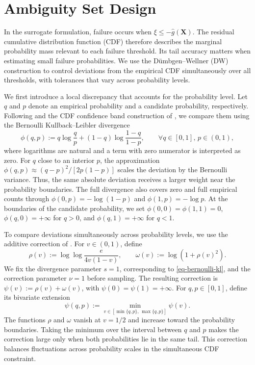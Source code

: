 \documentclass[review,11pt,3p,authoryear,nopreprintline]{elsarticle}
\begin{document}
\section{Ambiguity Set Design}
\label{sec-ambiguity-set}

In the surrogate formulation, failure occurs when $\xi\le-\hat g(\bm X)$. The residual cumulative distribution function (CDF) therefore describes the marginal probability mass relevant to each failure threshold. Its tail accuracy matters when estimating small failure probabilities. We use the D\"umbgen--Wellner (DW) construction \citep{L.J23} to control deviations from the empirical CDF simultaneously over all thresholds, with tolerances that vary across probability levels.

We first introduce a local discrepancy that accounts for the probability level. Let $q$ and $p$ denote an empirical probability and a candidate probability, respectively. Following \citet{B.J79} and the CDF confidence band construction of \citet{O95}, we compare them using the Bernoulli Kullback--Leibler divergence
\begin{equation}
  \phi(q,p):=q\log\frac{q}{p}+(1-q)\log\frac{1-q}{1-p},\qquad \forall q\in[0,1],\, p\in(0,1),
  \label{eq-bernoulli-kl}
\end{equation}
where logarithms are natural and a term with zero numerator is interpreted as zero. For $q$ close to an interior $p$, the approximation $\phi(q,p)\approx(q-p)^2/[2p(1-p)]$ scales the deviation by the Bernoulli variance. Thus, the same absolute deviation receives a larger weight near the probability boundaries. The full divergence also covers zero and full empirical counts through $\phi(0,p)=-\log(1-p)$ and $\phi(1,p)=-\log p$. At the boundaries of the candidate probability, we set $\phi(0,0)=\phi(1,1)=0$, $\phi(q,0)=+\infty$ for $q>0$, and $\phi(q,1)=+\infty$ for $q<1$.

To compare deviations simultaneously across probability levels, we use the additive correction of \citet{L.J23}. For $v\in(0,1)$, define
\begin{equation}
  \rho(v):=\log\log\frac{e}{4v(1-v)},\qquad \omega(v):=\log\!\left(1+\rho(v)^2\right).
  \label{eq-dw-correction-functions}
\end{equation}
We fix the divergence parameter $s=1$, corresponding to \eqref{eq-bernoulli-kl}, and the correction parameter $\nu=1$ before sampling. The resulting correction is $\psi(v):=\rho(v)+\omega(v)$, with $\psi(0)=\psi(1)=+\infty$. For $q,p\in[0,1]$, define its bivariate extension
\begin{equation}
  \psi(q,p):=\min_{v\in[\min\{q,p\},\,\max\{q,p\}]}\psi(v).
  \label{eq-dw-bivariate-correction}
\end{equation}
The functions $\rho$ and $\omega$ vanish at $v=1/2$ and increase toward the probability boundaries. Taking the minimum over the interval between $q$ and $p$ makes the correction large only when both probabilities lie in the same tail. This correction balances fluctuations across probability scales in the simultaneous CDF constraint.
\end{document}
